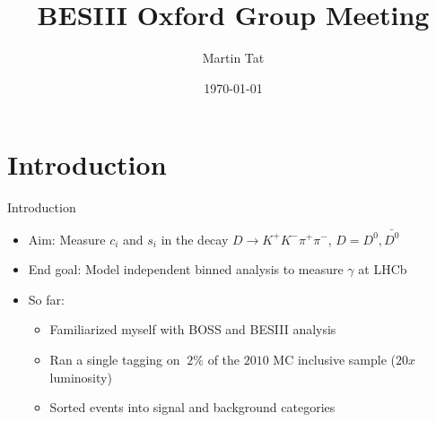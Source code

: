 \documentclass{beamer}
\title[BESIII Oxford]{BESIII Oxford Group Meeting}
\author{Martin Tat}
\institute{Oxford LHCb}
\date{\today}
\begin{document}
\begin{frame}
  \titlepage
\end{frame}


\section{Introduction}
\begin{frame}{Introduction}
  \begin{itemize}
    \item{Aim: Measure $c_i$ and $s_i$ in the decay $D\to K^+K^-\pi^+\pi^-$, $D = D^0, \bar{D^0}$}
    \item{End goal: Model independent binned analysis to measure $\gamma$ at LHCb}
    \item{So far:}
    \begin{itemize}
      \item{Familiarized myself with BOSS and BESIII analysis}
      \item{Ran a single tagging on $~2\%$ of the $2010$ MC inclusive sample ($20x$ luminosity)}
      \item{Sorted events into signal and background categories}
    \end{itemize}
  \end{itemize}
\end{frame}
\end{document}
